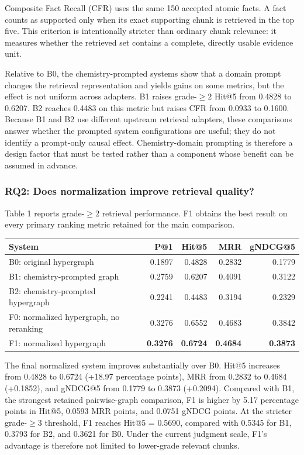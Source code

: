 Composite Fact Recall (CFR) uses the same 150 accepted atomic facts. A fact counts as supported only when its exact supporting chunk is retrieved in the top five. This criterion is intentionally stricter than ordinary chunk relevance: it measures whether the retrieved set contains a complete, directly usable evidence unit.

Relative to B0, the chemistry-prompted systems show that a domain prompt changes the retrieval representation and yields gains on some metrics, but the effect is not uniform across adapters. B1 raises grade-$\geq 2$ Hit@5 from 0.4828 to 0.6207. B2 reaches 0.4483 on this metric but raises CFR from 0.0933 to 0.1600. Because B1 and B2 use different upstream retrieval adapters, these comparisons answer whether the prompted system configurations are useful; they do not identify a prompt-only causal effect. Chemistry-domain prompting is therefore a design factor that must be tested rather than a component whose benefit can be assumed in advance.

\subsubsection{RQ2: Does normalization improve retrieval quality?}

Table 1 reports grade-$\geq 2$ retrieval performance. F1 obtains the best result on every primary ranking metric retained for the main comparison.

\begin{table}[t]
\centering
\small
\begin{tabularx}{\linewidth}{Xrrrr}
\toprule
System & P@1 & Hit@5 & MRR & gNDCG@5 \\
\midrule
B0: original hypergraph & 0.1897 & 0.4828 & 0.2832 & 0.1779 \\
B1: chemistry-prompted graph & 0.2759 & 0.6207 & 0.4091 & 0.3122 \\
B2: chemistry-prompted hypergraph & 0.2241 & 0.4483 & 0.3194 & 0.2329 \\
F0: normalized hypergraph, no reranking & 0.3276 & 0.6552 & 0.4683 & 0.3842 \\
F1: normalized hypergraph & \textbf{0.3276} & \textbf{0.6724} & \textbf{0.4684} & \textbf{0.3873} \\
\bottomrule
\end{tabularx}
\end{table}

The final normalized system improves substantially over B0. Hit@5 increases from 0.4828 to 0.6724 (+18.97 percentage points), MRR from 0.2832 to 0.4684 (+0.1852), and gNDCG@5 from 0.1779 to 0.3873 (+0.2094). Compared with B1, the strongest retained pairwise-graph comparison, F1 is higher by 5.17 percentage points in Hit@5, 0.0593 MRR points, and 0.0751 gNDCG points. At the stricter grade-$\geq 3$ threshold, F1 reaches Hit@5 = 0.5690, compared with 0.5345 for B1, 0.3793 for B2, and 0.3621 for B0. Under the current judgment scale, F1's advantage is therefore not limited to lower-grade relevant chunks.

